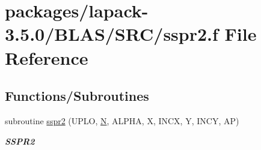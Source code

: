 \hypertarget{lapack-3_85_80_2BLAS_2SRC_2sspr2_8f}{}\section{packages/lapack-\/3.5.0/\+B\+L\+A\+S/\+S\+R\+C/sspr2.f File Reference}
\label{lapack-3_85_80_2BLAS_2SRC_2sspr2_8f}
\subsection*{Functions/\+Subroutines}
\begin{DoxyCompactItemize}
\item 
subroutine \hyperlink{group__single__blas__level2_gafa776cb448d7c8bc8acfaf7f6d283959}{sspr2} (U\+P\+L\+O, \hyperlink{polmisc_8c_a0240ac851181b84ac374872dc5434ee4}{N}, A\+L\+P\+H\+A, X, I\+N\+C\+X, Y, I\+N\+C\+Y, A\+P)
\begin{DoxyCompactList}\small\item\em {\bfseries S\+S\+P\+R2} \end{DoxyCompactList}\end{DoxyCompactItemize}
